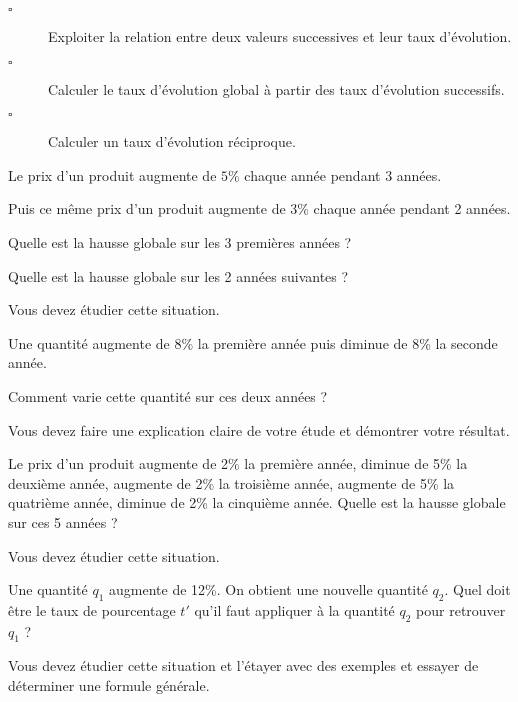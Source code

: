 \documentclass[10pt]{article}
\begin{document}
\begin{titre}

\end{titre}


\begin{CpsCol}
\begin{description}
\item[$\square$] Exploiter la relation entre deux valeurs successives et leur taux d'évolution.
\item[$\square$] Calculer le taux d'évolution global à partir des taux d'évolution successifs. 
\item[$\square$] Calculer un taux d'évolution réciproque.
\end{description}
\end{CpsCol}



\begin{Sit}
Le prix d'un produit augmente de $5$\% chaque année pendant 3 années. 

Puis ce même prix d'un produit augmente de 3\% chaque année pendant 2 années. 

Quelle est la hausse globale sur les 3 premières années ?

Quelle est la hausse globale sur les 2 années suivantes ?

Vous devez étudier cette situation.
\end{Sit}



\begin{Sit}
Une quantité augmente de 8\% la première année puis diminue de 8\% la seconde année. 

Comment varie cette quantité sur ces deux années ?

Vous devez faire une explication claire de votre étude et démontrer votre résultat. 
\end{Sit}



\begin{Sit}
Le prix d'un produit augmente de 2\% la première année, diminue de 5\% la deuxième année, augmente de 2\% la troisième année, augmente de 5\% la quatrième année, diminue de 2\% la cinquième année. Quelle est la hausse globale sur ces 5 années ?

Vous devez étudier cette situation. 
\end{Sit}



\begin{Sit}
Une quantité $q_1$ augmente de 12\%. On obtient une nouvelle quantité $q_2$. Quel doit être le taux de pourcentage $t'$ qu'il faut appliquer à la quantité $q_2$ pour retrouver $q_1$ ?

Vous devez étudier cette situation et l'étayer avec des exemples et essayer de déterminer une formule générale. 
\end{Sit}
\end{document}
